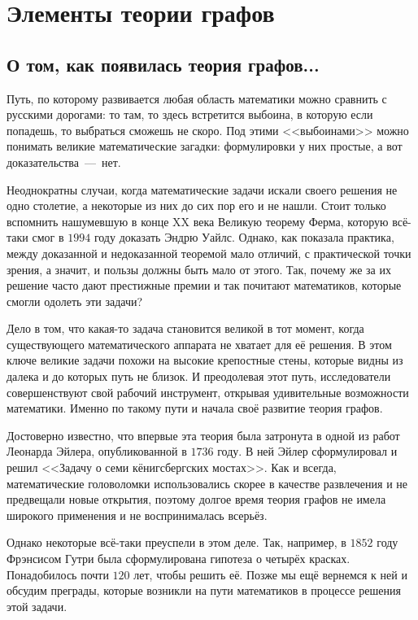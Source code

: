 \sloppy
\chapter{Элементы теории графов}
\section{О том, как появилась теория графов...}

	Путь, по которому развивается любая область математики можно сравнить с русскими дорогами: то там, то здесь встретится выбоина, в которую если попадешь, то выбраться сможешь не скоро. Под этими <<выбоинами>> можно понимать великие математические загадки: формулировки у них простые, а вот доказательства~---~нет.
	
	Неоднократны случаи, когда математические задачи искали своего решения не одно столетие, а некоторые из них до сих пор его и не нашли. Стоит только вспомнить нашумевшую в конце XX века Великую теорему Ферма, которую всё-таки смог в $1994$ году доказать Эндрю Уайлс. Однако, как показала практика, между доказанной и недоказанной теоремой мало отличий, с практической точки зрения, а значит, и пользы должны быть мало от этого. Так, почему же за их решение часто дают престижные премии и так почитают математиков, которые смогли одолеть эти задачи?
	
	Дело в том, что какая-то задача становится великой в тот момент, когда существующего математического аппарата не хватает для её решения. В этом ключе великие задачи похожи на высокие крепостные стены, которые видны из далека и до которых путь не близок. И преодолевая этот путь, исследователи совершенствуют свой рабочий инструмент, открывая удивительные возможности математики. Именно по такому пути и начала своё развитие теория графов.

	Достоверно известно, что впервые эта теория была затронута в одной из работ Леонарда Эйлера, опубликованной в $1736$ году. В ней Эйлер сформулировал и решил <<Задачу о семи кёнигсбергских мостах>>. Как и всегда, математические головоломки использовались скорее в качестве развлечения и не предвещали новые открытия, поэтому долгое время теория графов не имела широкого применения и не воспринималась всерьёз.  

	Однако некоторые всё-таки преуспели в этом деле. Так, например, в $1852$ году Фрэнсисом Гутри была сформулирована гипотеза о четырёх красках. Понадобилось почти $120$ лет, чтобы решить её. Позже мы ещё вернемся к ней и обсудим преграды, которые возникли на пути математиков в процессе решения этой задачи.
	
